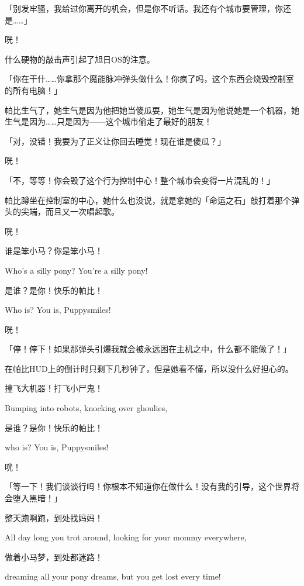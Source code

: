 「别发牢骚，我给过你离开的机会，但是你不听话。我还有个城市要管理，你还是……」

咣！

什么硬物的敲击声引起了旭日OS的注意。

「你在干什……你拿那个魔能脉冲弹头做什么！你疯了吗，这个东西会烧毁控制室的所有电脑！」

帕比生气了，她生气是因为他把她当傻瓜耍，她生气是因为他说她是一个机器，她生气是因为……只是因为——这个城市偷走了最好的朋友！

「对，没错！我要为了正义让你回去睡觉！现在谁是傻瓜？」

咣！

「不，等等！你会毁了这个行为控制中心！整个城市会变得一片混乱的！」

帕比蹲坐在控制室的中心，她什么也没说，就是拿她的「命运之石」敲打着那个弹头的尖端，而且又一次唱起歌。

咣！

\begin{song}
谁是笨小马？你是笨小马！

Who's a silly pony? You're a silly pony!

\medskip

是谁？是你！快乐的帕比！

Who is? You is, Puppysmiles!
\end{song}

咣！

「停！停下！如果那弹头引爆我就会被永远困在主机之中，什么都不能做了！」

在帕比HUD上的倒计时只剩下几秒钟了，但是她看不懂，所以没什么好担心的。

\begin{song}
撞飞大机器！打飞小尸鬼！

Bumping into robots, knocking over ghoulies,

\medskip

是谁？是你！快乐的帕比！

who is? You is, Puppysmiles!
\end{song}

咣！

「等一下！我们谈谈行吗！你根本不知道你在做什么！没有我的引导，这个世界将会堕入黑暗！」

\begin{song}
整天跑啊跑，到处找妈妈！

All day long you trot around, looking for your mommy everywhere,

做着小马梦，到处都迷路！

dreaming all your pony dreams, but you get lost every time!
\end{song}

